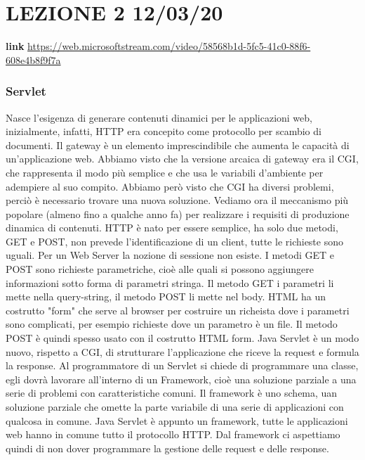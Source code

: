 \section{LEZIONE 2 12/03/20}
\textbf{link} \url{https://web.microsoftstream.com/video/58568b1d-5fc5-41c0-88f6-608e4b8f9f7a}
\subsubsection{Servlet}
Nasce l'esigenza di generare contenuti dinamici per le applicazioni web, inizialmente, infatti, HTTP era concepito come protocollo per scambio di documenti.\newline
Il gateway è un elemento imprescindibile che aumenta le capacità di un'applicazione web. Abbiamo visto che la versione arcaica di gateway era il CGI, che rappresenta il modo più semplice e che usa le variabili d'ambiente per adempiere al suo compito. Abbiamo però visto che CGI ha diversi problemi, perciò è necessario trovare una nuova soluzione.\newline
Vediamo ora il meccanismo più popolare (almeno fino a qualche anno fa) per realizzare i requisiti di produzione dinamica di contenuti. HTTP è nato per essere semplice, ha solo due metodi, GET e POST, non prevede l'identificazione di un client, tutte le richieste sono uguali. Per un Web Server la nozione di sessione non esiste. I metodi GET e POST sono richieste parametriche, cioè alle quali si possono aggiungere informazioni sotto forma di parametri stringa. Il metodo GET i parametri li mette nella query-string, il metodo POST li mette nel body. HTML ha un costrutto "form" che serve al browser per costruire un richeista dove i parametri sono complicati, per esempio richieste dove un parametro è un file. Il metodo POST è quindi spesso usato con il costrutto HTML form.\newline
Java Servlet è un modo nuovo, rispetto a CGI, di strutturare l'applicazione che riceve la request e formula la response.\newline
Al programmatore di un Servlet si chiede di programmare una classe, egli dovrà lavorare all'interno di un Framework, cioè una soluzione parziale a una serie di problemi con caratteristiche comuni. Il framework è uno schema, uan soluzione parziale che omette la parte variabile di una serie di applicazioni con qualcosa in comune. Java Servlet è appunto un framework, tutte le applicazioni web hanno in comune tutto il protocollo HTTP. Dal framework ci aspettiamo quindi di non dover programmare la gestione delle request e delle response.\newline
